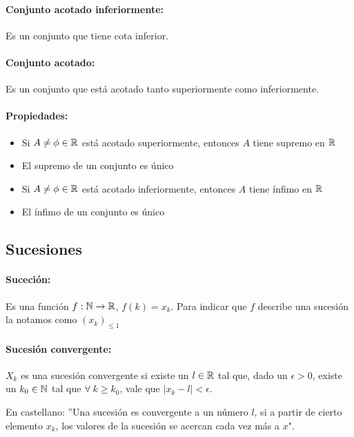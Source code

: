 \paragraph{Conjunto acotado inferiormente: } Es un conjunto que tiene cota inferior.

\paragraph{Conjunto acotado:} Es un conjunto que está acotado tanto superiormente como inferiormente.

\paragraph{Propiedades:}
\begin{itemize}
\item Si $A\neq\phi\in\mathbb{R}$ está acotado superiormente, entonces $A$ tiene supremo en $\mathbb{R}$
\item El supremo de un conjunto es único
\item Si $A\neq\phi\in\mathbb{R}$ está acotado inferiormente, entonces $A$ tiene ínfimo en $\mathbb{R}$
\item El ínfimo de un conjunto es único
\end{itemize}

\subsection{Sucesiones}
\paragraph{Suceción: } Es una función $f : \mathbb{N}\rightarrow \mathbb{R}$, $f(k) = x_k$. Para indicar que $f$ describe una sucesión la notamos como $(x_k)_{\leq 1}$
 
\paragraph{Sucesión convergente: } $X_k$ es una sucesión convergente si existe un $l\in\mathbb{R}$ tal que, dado un $\epsilon > 0$, existe un $k_0\in\mathbb{N}$ tal que $\forall~k\geq k_0$, vale que $|x_k - l| < \epsilon$.

\begin{center}
\begin{minipage}{0.9\textwidth}
En castellano: ''Una sucesión es convergente a un número $l$, si a partir de cierto elemento $x_k$, los valores de la sucesión se acercan cada vez más a $x$".
\end{minipage}
\end{center}

